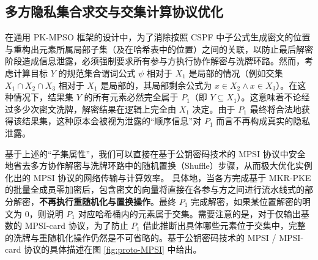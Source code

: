\subsection{多方隐私集合求交与交集计算协议优化}

在通用 PK-MPSO 框架的设计中，为了消除按照 CSPF 中子公式生成密文的位置与重构出元素所属局部子集（及在哈希表中的位置）之间的关联，以防止最后解密阶段造成信息泄露，必须强制要求所有参与方执行协作解密与洗牌环路。然而，考虑计算目标 $Y$ 的规范集合谓词公式 $\psi$ 相对于 $X_1$ 是局部的情况（例如交集 $X_1 \cap X_2 \cap X_3$ 相对于 $X_1$ 是局部的，其局部剩余公式为 $x \in X_2 \land x \in X_3$）。在这种情况下，结果集 $Y$ 的所有元素必然完全属于 $P_1$（即 $Y \subseteq X_1$）。这意味着不论经过多少次密文洗牌，解密结果在逻辑上完全由 $X_1$ 决定。由于 $P_1$ 最终将合法地获得该结果集，这种原本会被视为泄露的“顺序信息”对 $P_1$ 而言不再构成真实的隐私泄露。

基于上述的“子集属性”，我们可以直接在基于公钥密码技术的 MPSI 协议中安全地省去多方协作解密与洗牌环路中的随机置换（Shuffle）步骤，从而极大优化实例化出的 MPSI 协议的网络传输与计算效率。
具体地，当各方完成基于 MKR-PKE 的批量全成员零加密后，包含密文的向量将直接在各参与方之间进行流水线式的部分解密，\textbf{不再执行重随机化与置换操作}。最终 $P_1$ 完成解密，如果某位置解密的明文为 0，则说明 $P_1$ 对应哈希桶内的元素属于交集。需要注意的是，对于仅输出基数的 MPSI-card 协议，为了防止 $P_1$ 借此推断出具体哪些元素位于交集中，完整的洗牌与重随机化操作仍然是不可省略的。基于公钥密码技术的 MPSI / MPSI-card 协议的具体描述在图 \ref{fig:proto-MPSI} 中给出。

